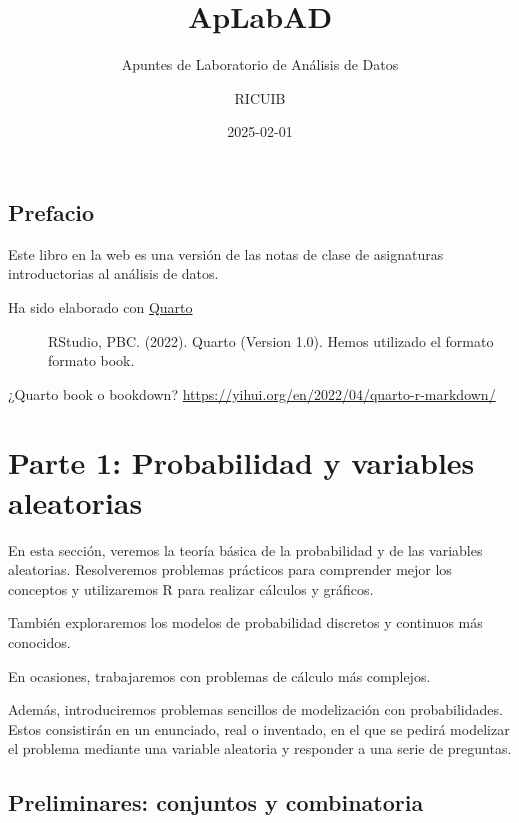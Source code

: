 \documentclass[
  letterpaper,
  DIV=11,
  numbers=noendperiod]{scrreprt}
\title{ApLabAD}
\subtitle{Apuntes de Laboratorio de Análisis de Datos}
\author{RICUIB}
\date{2025-02-01}
\renewcommand*\contentsname{Tabla de contenidos}
\newcommand\contentsname{Tabla de contenidos}
\begin{document}
\maketitle

\renewcommand*\contentsname{Tabla de contenidos}
{
\hypersetup{linkcolor=}
\setcounter{tocdepth}{2}
\tableofcontents
}


\chapter*{Prefacio}\label{prefacio}


Este libro en la web es una versión de las notas de clase de asignaturas
introductorias al análisis de datos.

\begin{description}
\item[Ha sido elaborado con \href{https://quarto.org/}{Quarto}]
RStudio, PBC. (2022). Quarto (Version 1.0). Hemos utilizado el formato
formato book.
\end{description}

¿Quarto book o bookdown?
\url{https://yihui.org/en/2022/04/quarto-r-markdown/}

\part{Parte 1: Probabilidad y variables aleatorias}

En esta sección, veremos la teoría básica de la probabilidad y de las
variables aleatorias. Resolveremos problemas prácticos para comprender
mejor los conceptos y utilizaremos R para realizar cálculos y gráficos.

También exploraremos los modelos de probabilidad discretos y continuos
más conocidos.

En ocasiones, trabajaremos con problemas de cálculo más complejos.

Además, introduciremos problemas sencillos de modelización con
probabilidades. Estos consistirán en un enunciado, real o inventado, en
el que se pedirá modelizar el problema mediante una variable aleatoria y
responder a una serie de preguntas.

\chapter{Preliminares: conjuntos y
combinatoria}\label{preliminares-conjuntos-y-combinatoria}
\end{document}
